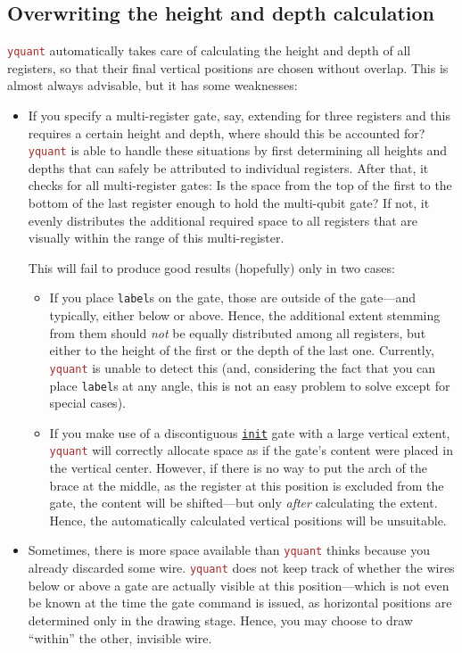 \documentclass{scrartcl}
\def\pkg#1{\textcolor{brown}{\texttt{#1}}}
\def\gate#1{\hyperref[gate:#1]{\texttt{#1}}}
\def\Yquant{\pkg{yquant}}
\begin{document}
      \subsection{Overwriting the height and depth calculation}
         \Yquant{} automatically takes care of calculating the height and depth of all registers, so that their final vertical positions are chosen without overlap.
         This is almost always advisable, but it has some weaknesses:
         \begin{itemize}
            \item If you specify a multi\hyp register gate, say, extending for three registers and this requires a certain height and depth, where should this be accounted for?
               \Yquant{} is able to handle these situations by first determining all heights and depths that can safely be attributed to individual registers.
               After that, it checks for all multi\hyp register gates: Is the space from the top of the first to the bottom of the last register enough to hold the multi\hyp qubit gate?
               If not, it evenly distributes the additional required space to all registers that are visually within the range of this multi\hyp register.

               This will fail to produce good results (hopefully) only in two cases:
               \begin{itemize}
                  \item If you place \texttt{label}s on the gate, those are outside of the gate---and typically, either below or above.
                     Hence, the additional extent stemming from them should \emph{not} be equally distributed among all registers, but either to the height of the first or the depth of the last one.
                     Currently, \Yquant{} is unable to detect this (and, considering the fact that you can place \texttt{label}s at any angle, this is not an easy problem to solve except for special cases).
                  \item If you make use of a discontiguous \gate{init} gate with a large vertical extent, \Yquant{} will correctly allocate space as if the gate's content were placed in the vertical center.
                     However, if there is no way to put the arch of the brace at the middle, as the register at this position is excluded from the gate, the content will be shifted---but only \emph{after} calculating the extent.
                     Hence, the automatically calculated vertical positions will be unsuitable.
               \end{itemize}
            \item Sometimes, there is more space available than \Yquant{} thinks because you already discarded some wire.
               \Yquant{} does not keep track of whether the wires below or above a gate are actually visible at this position---which is not even be known at the time the gate command is issued, as horizontal positions are determined only in the drawing stage.
               Hence, you may choose to draw ``within'' the other, invisible wire.
         \end{itemize}
\end{document}
